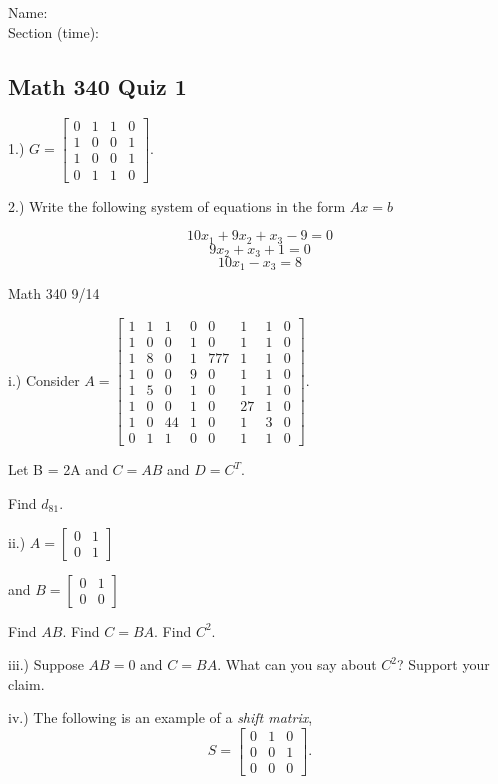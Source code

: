 \documentclass{article}
\begin{document}
Name:\\
\medskip
Section (time):

\subsection*{Math 340 Quiz 1}


1.) $G=\left[\begin{array}{cccc}
0 & 1 & 1 & 0\\
1 & 0 & 0 & 1\\
1 & 0 & 0 & 1\\
0 & 1 & 1 & 0
\end{array}\right]$. 

2.) Write the following system of equations in the form $Ax = b$

$$10x_1+9x_2+x_3-9=0$$
$$9x_2+x_3+1=0$$
$$10x_1 - x_3=8$$


\pagebreak
Math 340 9/14

i.) Consider $A=\left[\begin{array}{cccccccc}
1 & 1 & 1 & 0 & 0 & 1 & 1 & 0\\
1 & 0 & 0 & 1& 0 & 1 & 1 & 0\\
1 & 8 & 0 & 1 & 777 & 1 & 1 & 0\\
1 & 0 & 0 & 9 & 0 & 1 & 1 & 0\\
1 & 5 & 0 & 1 & 0 & 1 & 1 & 0\\
1 & 0 & 0 & 1 & 0 & 27 & 1 & 0\\
1 & 0 & 44 & 1 & 0 & 1 & 3 & 0\\
0 & 1 & 1 & 0 &0 & 1 & 1 & 0
\end{array}\right]$.

Let B = 2A and $C=AB$ and $D=C^T$.

Find $d_{81}$.


\bigskip

ii.) $A=\left[\begin{array}{cc}
0 & 1 \\
0 & 1
\end{array}\right]$

and $B=\left[\begin{array}{cc}
0 & 1 \\
0 & 0
\end{array}\right]$

Find $AB$. Find $C=BA$. Find $C^2$.


iii.) Suppose $AB=0$ and $C=BA$. What can you say about $C^2$? Support your claim. 



iv.) The following is an example of a \emph{shift matrix}, 
$$S = \left[\begin{array}{ccc}
0 & 1 & 0\\
0 & 0 & 1\\
0 & 0 & 0
\end{array}\right].$$
\end{document}
